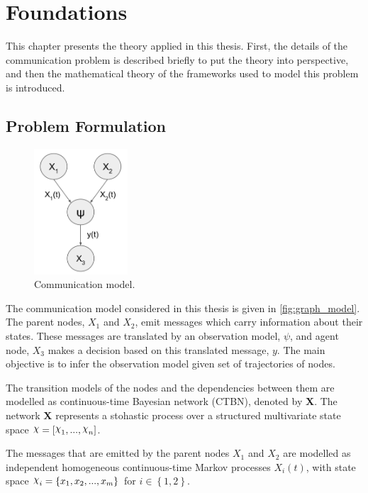 \chapter{Foundations}
\label{chap:2}

This chapter presents the theory applied in this thesis. First, the details of the communication problem is described briefly to put the theory into perspective, and then the mathematical theory of the frameworks used to model this problem is introduced. 

\section{Problem Formulation}
\label{sec:prob_formulation}
\begin{figure}
	\begin{center}
		\includegraphics[width=3.5cm]{figures/simple_graph}
		\caption{Communication model.}
	\end{center}
	\label{fig:graph_model}
\end{figure} 
The communication model considered in this thesis is given in \autoref{fig:graph_model}. The parent nodes, $X_{1}$ and $ X_{2}$, emit messages which carry information about their states. These messages are translated by an observation model, $\psi$, and agent node, $ X_{3} $ makes a decision based on this translated message, $ y $. The main objective is to infer the observation model given set of trajectories of nodes.

The transition models of the nodes and the dependencies between them are modelled as continuous-time Bayesian network (CTBN), denoted by \textbf{X}. The network \textbf{X} represents a stohastic process over a structured multivariate state space $ \rchi = [\rchi_1,..., \rchi_n] $. 

The messages that are emitted by the parent nodes $X_{1}$ and $ X_{2} $ are modelled as independent homogeneous continuous-time Markov processes $X_{i}(t)$, with state space $ \rchi_{i} = \left\lbrace x_{1}, x_{2}, ..., x_{m} \right\rbrace  $ for $ i \in \left\lbrace 1,2 \right\rbrace $.


